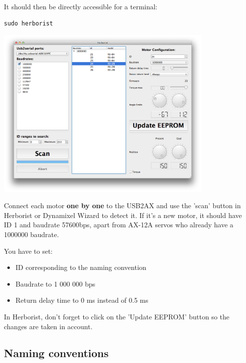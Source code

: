 \documentclass{article}
\begin{document}
It should then be directly accessible for a terminal:
\begin{verbatim}
sudo herborist
\end{verbatim}
 \begin{center}
  \includegraphics[width=0.8\textwidth]{img/herborist}
 \end{center}
 
 Connect each motor \textbf{one by one} to the USB2AX and use the 'scan' button in Herborist or Dynamixel Wizard to detect it. If it's a new motor, it should have ID 1 and baudrate 57600bps, apart from AX-12A servos who already have a 1000000 baudrate.

You have to set:
\begin{itemize}
\item ID corresponding to the naming convention
\item Baudrate to 1 000 000 bps
\item Return delay time to 0 ms instead of 0.5 ms
\end{itemize}

In Herborist, don't forget to click on the 'Update EEPROM' button so the changes are taken in account.


\subsection{Naming conventions}
\end{document}
